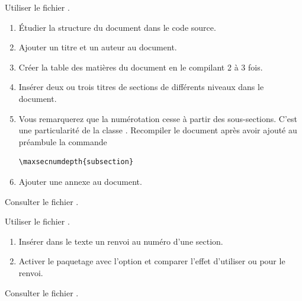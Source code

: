 \begin{exercice}
  Utiliser le fichier .
  \begin{enumerate}
  \item Étudier la structure du document dans le code source.
  \item Ajouter un titre et un auteur au document.
  \item Créer la table des matières du document en le compilant 2 à 3
    fois.
  \item Insérer deux ou trois titres de sections de différents niveaux
    dans le document.
  \item Vous remarquerez que la numérotation cesse à partir des
    sous-sections. C'est une particularité de la classe
    . Recompiler le document après avoir ajouté au
    préambule la commande
\begin{lstlisting}
\maxsecnumdepth{subsection}
\end{lstlisting}
  \item Ajouter une annexe au document.
  \end{enumerate}
  \begin{sol}
    Consulter le fichier .
  \end{sol}
\end{exercice}

\begin{exercice}
  Utiliser le fichier .
  \begin{enumerate}
  \item Insérer dans le texte un renvoi au numéro d'une section.
  \item Activer le paquetage  avec l'option
     et comparer l'effet d'utiliser \cmd{\ref} ou
    \cmd{\autoref} pour le renvoi.
  \end{enumerate}
  \begin{sol}
    Consulter le fichier .
  \end{sol}
\end{exercice}


